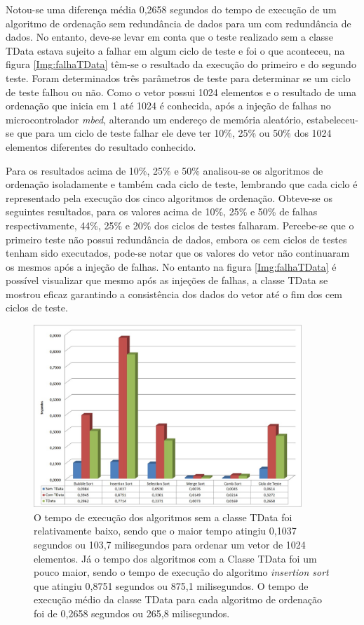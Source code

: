 Notou-se uma diferença média 0,2658 segundos do tempo de execução de um algoritmo de ordenação sem redundância de dados para um com redundância de dados. No entanto, deve-se levar em conta que o teste realizado sem a classe TData estava sujeito a falhar em algum ciclo de teste e foi o que aconteceu, na figura \ref{Img:falhaTData} têm-se o resultado da execução do primeiro e do segundo teste. Foram determinados três parâmetros de teste para determinar se um ciclo de teste falhou ou não. Como o vetor possui 1024 elementos e o resultado de uma ordenação que inicia em 1 até 1024 é conhecida, após a injeção de falhas no microcontrolador \textit{mbed}, alterando um endereço de memória aleatório, estabeleceu-se que para um ciclo de teste falhar ele deve ter 10\%, 25\% ou 50\% dos 1024 elementos diferentes do resultado conhecido. 

Para os resultados acima de 10\%, 25\% e 50\% analisou-se os algoritmos de ordenação isoladamente e também cada ciclo de teste, lembrando que cada ciclo é representado pela execução dos cinco algoritmos de ordenação. Obteve-se os seguintes resultados, para os valores acima de 10\%, 25\% e 50\% de falhas respectivamente, 44\%, 25\% e 20\% dos ciclos de testes falharam. Percebe-se que o primeiro teste não possui redundância de dados, embora os cem ciclos de testes tenham sido executados, pode-se notar que os valores do vetor não continuaram os mesmos após a injeção de falhas. No entanto na figura \ref{Img:falhaTData} é possível visualizar que mesmo após as injeções de falhas, a classe TData se mostrou eficaz garantindo a consistência dos dados do vetor até o fim dos cem ciclos de teste.


\begin{figure}[h]
	\centering
	\includegraphics[width=0.9\textwidth]{figuras/tempoTData.jpg}
	\caption[Tempo de execução da Classe TData ]{O tempo de execução dos algoritmos sem a classe TData foi relativamente baixo, sendo que o maior tempo atingiu 0,1037 segundos ou 103,7 milisegundos para ordenar um vetor de 1024 elementos. Já o tempo dos algoritmos com a Classe TData foi um pouco maior, sendo o tempo de execução do algoritmo \textit{insertion sort} que atingiu 0,8751 segundos ou 875,1 milisegundos. O tempo de execução médio da classe TData para cada algoritmo de ordenação foi de 0,2658 segundos ou 265,8 milisegundos.}
	\label{Img:tempoTData}	
\end{figure}

